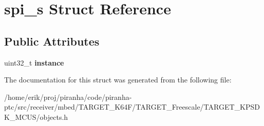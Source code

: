 \hypertarget{structspi__s}{}\section{spi\+\_\+s Struct Reference}
\label{structspi__s}
\subsection*{Public Attributes}
\begin{DoxyCompactItemize}
\item 
uint32\+\_\+t {\bfseries instance}\hypertarget{structspi__s_a10a872f72391d7aaabe970d3084f8568}{}\label{structspi__s_a10a872f72391d7aaabe970d3084f8568}

\end{DoxyCompactItemize}


The documentation for this struct was generated from the following file\+:\begin{DoxyCompactItemize}
\item 
/home/erik/proj/piranha/code/piranha-\/ptc/src/receiver/mbed/\+T\+A\+R\+G\+E\+T\+\_\+\+K64\+F/\+T\+A\+R\+G\+E\+T\+\_\+\+Freescale/\+T\+A\+R\+G\+E\+T\+\_\+\+K\+P\+S\+D\+K\+\_\+\+M\+C\+U\+S/objects.\+h\end{DoxyCompactItemize}

